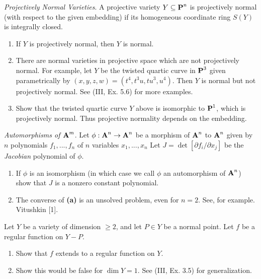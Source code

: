 \documentclass[10pt]{amsart}
\begin{document}
\begin{exercise}[3.18]
    \emph{Projectively Normal Varieties}. A projective variety $Y \subseteq \pp^n$ is projectively normal 
    (with respect to the given embedding) if its homogeneous coordinate ring $S(Y)$ is integrally closed.
    \begin{enumerate}[itemsep=2pt]
        \item If $Y$ is projectively normal, then $Y$ is normal.
        \item There are normal varieties in projective space which are not projectively normal. For example, let $Y$ be the 
        twisted quartic curve in $\pp^3$ given parametrically by $(x,y,z,w) = (t^4 ,t^3u,tu^3,u^4)$. Then $Y$ is normal 
        but not projectively normal. See (III, Ex. 5.6) for more examples.
        \item Show that the twisted quartic curve $Y$ above is isomorphic to $\pp^1$, which is projectively normal. 
        Thus projective normality depends on the embedding.
    \end{enumerate}
\end{exercise}

\begin{exercise}[3.19]
    \emph{Automorphisms of $\aa^m$}. Let $\phi: \aa^n \to \aa^n$ be a morphism of $\aa^n$ to $\aa^n$ given 
    by $n$ polynomials $f_1, ... ,f_n$ of $n$ variables $x_1, ... ,x_n$ Let $J = \det [\partial f_i/\partial x_j] $ 
    be the \emph{Jacobian} polynomial of $\phi$.
    \begin{enumerate}[itemsep=2pt]
        \item If $\phi$ is an isomorphism (in which case we call $\phi$ an automorphism of $\aa^n$) show
        that $J$ is a nonzero constant polynomial.
        \item The converse of {\bf (a)} is an unsolved problem, even for $n = 2$. See, for example.
        Vitushkin [1].
    \end{enumerate}
\end{exercise}

\begin{exercise}[3.20]
    Let $Y$ be a variety of dimension $\ge 2$, and let $P \in Y$ be a normal point. Let $f$ be a regular function 
    on $Y - P$.
    \begin{enumerate}[itemsep=2pt]
        \item Show that $f$ extends to a regular function on $Y$.
        \item Show this would be false for $\dim Y = 1$.
        See (III, Ex. 3.5) for generalization.
    \end{enumerate}
\end{exercise}
\end{document}
